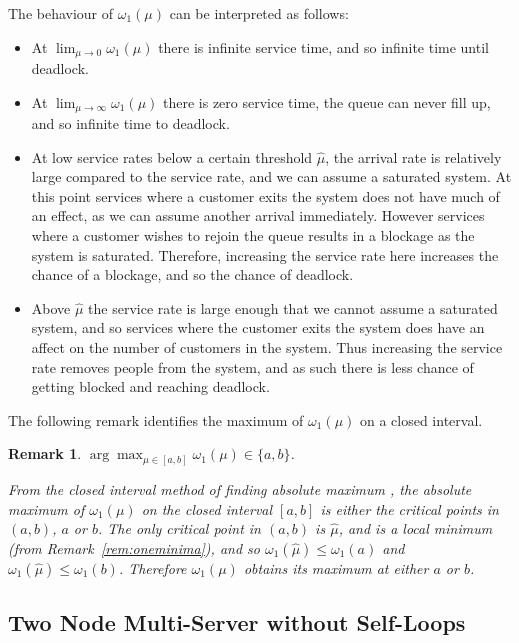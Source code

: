 \documentclass{article}
\newtheorem{remark}{Remark}
\numberwithin{equation}{section}
\begin{document}
The behaviour of $\omega_1(\mu)$ can be interpreted as follows:
\begin{itemize}
\item At $\lim_{\mu \to 0} \omega_1 (\mu)$ there is infinite service time,
and so infinite time until deadlock.
\item At $\lim_{\mu \to \infty} \omega_1 (\mu)$ there is zero service time,
the queue can never fill up, and so infinite time to deadlock.
\item At low service rates below a certain threshold $\hat{\mu}$, the arrival
rate is relatively large compared to the service rate, and we can assume a
saturated system.
At this point services where a customer exits the system does not have much of
an effect, as we can assume another arrival immediately.
However services where a customer wishes to rejoin the queue results in a
blockage as the system is saturated.
Therefore, increasing the service rate here increases the chance of a
blockage, and so the chance of deadlock.
\item Above $\hat{\mu}$ the service rate is large enough that we cannot assume
a saturated system, and so services where the customer exits the system does
have an affect on the number of customers in the system.
Thus increasing the service rate removes people from the system, and as such
there is less chance of getting blocked and reaching deadlock.
\end{itemize}

The following remark identifies the maximum of $\omega_1(\mu)$ on a closed
interval.\\

\begin{remark}\label{rem:findmaximum}
$\arg\max_{\mu \in [a, b]} \omega_1(\mu) \in \{a, b\}$.

From the closed interval method of finding absolute maximum \cite{tan09}, the
absolute maximum of $\omega_1(\mu)$ on the closed interval $[a, b]$ is either
the critical points in $(a, b)$, $a$ or $b$.
The only critical point in $(a, b)$ is $\hat{\mu}$, and is a local minimum
(from Remark~\ref{rem:oneminima}), and so $\omega_1(\hat{\mu}) \leq \omega_1(a)$
and $\omega_1(\hat{\mu}) \leq \omega_1(b)$.
Therefore $\omega_1(\mu)$ obtains its maximum at either $a$ or $b$.
\end{remark}


\subsection{Two Node Multi-Server without Self-Loops}\label{sec:2nodeMS}
\end{document}
